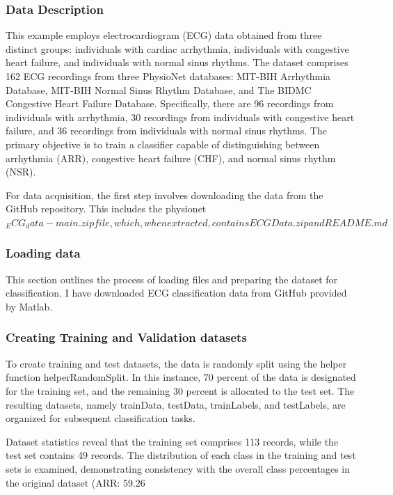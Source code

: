 \documentclass{article}
\begin{document}
\subsubsection{Data Description}
This example employs electrocardiogram (ECG) data obtained from three distinct groups: individuals with cardiac arrhythmia, individuals with congestive heart failure, and individuals with normal sinus rhythms. The dataset comprises 162 ECG recordings from three PhysioNet databases: MIT-BIH Arrhythmia Database, MIT-BIH Normal Sinus Rhythm Database, and The BIDMC Congestive Heart Failure Database. Specifically, there are 96 recordings from individuals with arrhythmia, 30 recordings from individuals with congestive heart failure, and 36 recordings from individuals with normal sinus rhythms. The primary objective is to train a classifier capable of distinguishing between arrhythmia (ARR), congestive heart failure (CHF), and normal sinus rhythm (NSR).

For data acquisition, the first step involves downloading the data from the GitHub repository. This includes the physionet$_ECG_data-main.zip file, which, when extracted, contains ECGData.zip and README.md$

\subsubsection{Loading data}
This section outlines the process of loading files and preparing the dataset for classification. I have downloaded ECG classification data from GitHub provided by Matlab.

\subsubsection{Creating Training and Validation datasets }
To create training and test datasets, the data is randomly split using the helper function helperRandomSplit. In this instance, 70 percent of the data is designated for the training set, and the remaining 30 percent is allocated to the test set. The resulting datasets, namely trainData, testData, trainLabels, and testLabels, are organized for subsequent classification tasks.

Dataset statistics reveal that the training set comprises 113 records, while the test set contains 49 records. The distribution of each class in the training and test sets is examined, demonstrating consistency with the overall class percentages in the original dataset (ARR: 59.26%
\end{document}
